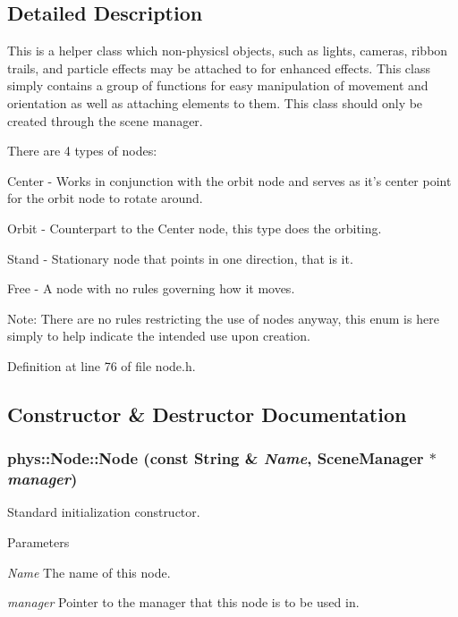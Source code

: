 \subsection{Detailed Description}
This is a helper class which non-\/physicsl objects, such as lights, cameras, ribbon trails, and particle effects may be attached to for enhanced effects. This class simply contains a group of functions for easy manipulation of movement and orientation as well as attaching elements to them. This class should only be created through the scene manager. \par
 There are 4 types of nodes: \par
 Center -\/ Works in conjunction with the orbit node and serves as it's center point for the orbit node to rotate around. \par
 Orbit -\/ Counterpart to the Center node, this type does the orbiting. \par
 Stand -\/ Stationary node that points in one direction, that is it. \par
 Free -\/ A node with no rules governing how it moves. \par
 Note: There are no rules restricting the use of nodes anyway, this enum is here simply to help indicate the intended use upon creation. 

Definition at line 76 of file node.h.



\subsection{Constructor \& Destructor Documentation}
\hypertarget{classphys_1_1Node_a09393f483ab4bb2fdb74b26a59ffd37e}{
\subsubsection[{Node}]{\setlength{\rightskip}{0pt plus 5cm}phys::Node::Node (const {\bf String} \& {\em Name}, \/  {\bf SceneManager} $\ast$ {\em manager})}}
\label{d0/ddc/classphys_1_1Node_a09393f483ab4bb2fdb74b26a59ffd37e}


Standard initialization constructor. 


\begin{DoxyParams}{Parameters}
\item[{\em Name}]The name of this node. \item[{\em manager}]Pointer to the manager that this node is to be used in. \end{DoxyParams}


